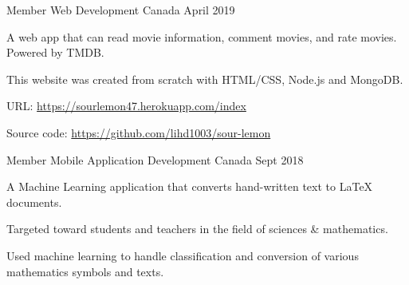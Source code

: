 \begin{cventries}

  \cventry
    {Member} %
    {Web Development} %
    {Canada} %
    {April 2019} %
    {
      \begin{cvitems} %
        \item {A web app that can read movie information, comment movies, and rate movies. Powered by TMDB. }
        \item {This website was created from scratch with HTML/CSS, Node.js and MongoDB.}
        \item {URL: \url{https://sourlemon47.herokuapp.com/index}}
        \item {Source code: \url{https://github.com/lihd1003/sour-lemon}}
      \end{cvitems}
    }

  \cventry
    {Member} %
    {Mobile Application Development} %
    {Canada} %
    {Sept 2018} %
    {
      \begin{cvitems} %
        \item {A Machine Learning application that converts hand-written text to LaTeX documents.}
        \item {Targeted toward students and teachers in the field of sciences & mathematics.}
        \item {Used machine learning to handle classification and conversion of various mathematics symbols and texts.}
        \item {}
      \end{cvitems}
    }


\end{cventries}
